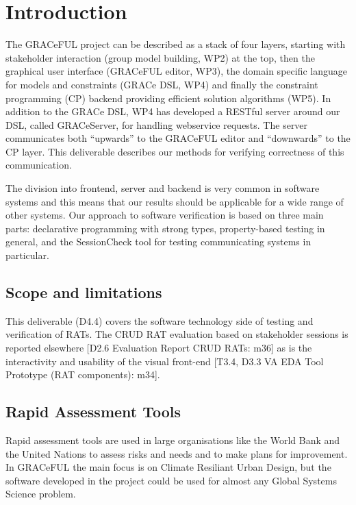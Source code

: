 \documentclass{article}
\begin{document}
\section{Introduction}
\label{sec:intro}

The GRACeFUL project can be described as a stack of four layers,
starting with stakeholder interaction (group model building, WP2) at
the top, then the graphical user interface (GRACeFUL editor, WP3), the
domain specific language for models and constraints (GRACe DSL, WP4)
and finally the constraint programming (CP) backend providing
efficient solution algorithms (WP5).
%
In addition to the GRACe DSL, WP4 has developed a RESTful server around our DSL,
called GRACeServer, for handling webservice requests. The server communicates
both ``upwards'' to the GRACeFUL editor and ``downwards'' to the CP layer.
%
This deliverable describes our methods for verifying correctness of
this communication.

The division into frontend, server and backend is very common in
software systems and this means that our results should be applicable
for a wide range of other systems.
%
Our approach to software verification is based on three main parts:
%
declarative programming with strong types, property-based testing in
general, and the SessionCheck tool for testing communicating systems
in particular.

\subsection{Scope and limitations}

This deliverable (D4.4) covers the software technology side of testing
and verification of RATs.
%
The CRUD RAT evaluation based on stakeholder sessions is reported
elsewhere [D2.6 Evaluation Report CRUD RATs: m36] as is the
interactivity and usability of the visual front-end [T3.4, D3.3 VA EDA
Tool Prototype (RAT components): m34].

\subsection{Rapid Assessment Tools}

Rapid assessment tools are used in large organisations like the World
Bank and the United Nations to assess risks and needs and to make
plans for improvement.
In GRACeFUL the main focus is on Climate Resiliant Urban Design, but
the software developed in the project could be used for almost any
Global Systems Science problem.
\end{document}
